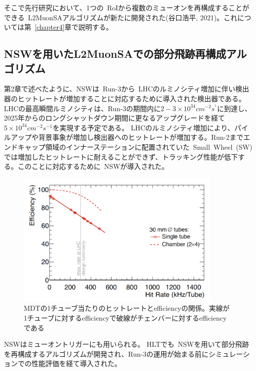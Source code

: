 そこで先行研究\cite{article:taniguchi}において、1つの~RoIから複数のミューオンを再構成することができる~L2MuonSAアルゴリズムが新たに開発された(谷口浩平, 2021)。これについては第~\ref{chapter4}章で説明する。


\subsection{NSWを用いたL2MuonSAでの部分飛跡再構成アルゴリズム}\label{chapter3-3-2}
第2章で述べたように、NSWは~Run-3から~LHCのルミノシティ増加に伴い検出器のヒットレートが増加することに対応するために導入された検出器である。
LHCの最高瞬間ルミノシティは、Run-3の期間内に$2-3\times10^{34}cm^{-2}s^{^1}$に到達し、2025年からのロングシャットダウン期間に更なるアップグレードを経て$5\times10^{34}cm^{-2}s^{-1}$を実現する予定である。
LHCのルミノシティ増加により、パイルアップや背景事象が増加し検出器へのヒットレートが増加する。Run-2までエンドキャップ領域のインナーステーションに配置されていた~Small~Wheel~(SW)では増加したヒットレートに耐えることができず、トラッキング性能が低下する。このことに対応するために~NSWが導入された。

\begin{figure}[H]
    \centering
    \includegraphics[clip, width=10cm]{fig/3/NSW_HitRate.png}
    \caption{MDTの1チューブ当たりのヒットレートとefficiencyの関係。実線が1チューブに対するefficiencyで破線がチェンバーに対するefficiencyである\cite{article:ATLASNSWTDR}}
    \label{fig:3-14}
\end{figure}


NSWはミューオントリガーにも用いられる。
HLTでも~NSWを用いて部分飛跡を再構成するアルゴリズムが開発され、Run-3の運用が始まる前にシミュレーションでの性能評価を経て導入された。

